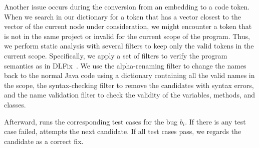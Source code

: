 Another issue occurs during the conversion from an embedding to a code
token. When we search in our dictionary for a token that has a vector
closest to the vector of the current node under consideration, we
might encounter a token that is not in the same project or invalid for
the current scope of the program. Thus, we perform static analysis
with several filters to keep only the valid tokens in the current
scope. Specifically, we apply a set of filters to verify the program
semantics as in DLFix~\cite{icse20}. We use the alpha-renaming filter
to change the names back to the normal Java code using a dictionary
containing all the valid names in the scope, the syntax-checking
filter to remove the candidates with syntax errors, and the name
validation filter to check the validity of the variables, methods, and
classes.

Afterward, \tool runs the corresponding test cases for the bug
$b_i$. If there is any test case failed, \tool attempts the next
candidate. If all test cases pass, we regards the candidate as
a correct fix.






